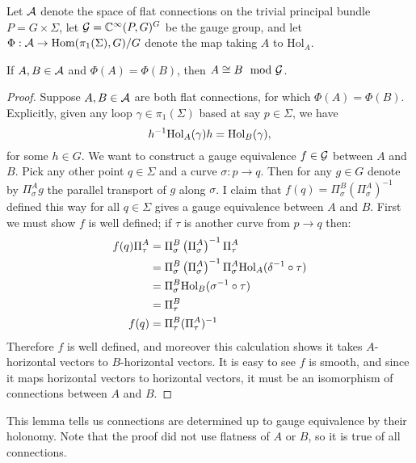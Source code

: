 	Let $\mathcal{A}$ denote the space of flat connections on the trivial principal bundle $P=G\times \Sigma$, let $\mathcal{G} = \mathbb{C}^\infty(P, G)^G$ be the gauge group, and let $\Phi:\mathcal{A} \to \text{Hom}(\pi_1(\Sigma),G)/G$ denote the map taking $A$ to $\text{Hol}_A$. 
	\begin{lemma}
		If $A,B\in \mathcal{A}$ and $\Phi(A) = \Phi(B)$, then $A \cong B \mod {\mathcal{G}}$.
	\end{lemma}
	\begin{proof}
		Suppose $A,B\in \mathcal{A}$ are both flat connections, for which $\Phi(A) = \Phi(B)$. Explicitly, given any loop $\gamma\in \pi_1(\Sigma)$ based at say $p\in \Sigma$, we have 
		\begin{equation*}
			h^{-1}\text{Hol}_A(\gamma)h = \text{Hol}_B(\gamma), 
		\end{equation*}
		for some $h\in G$. We want to construct a gauge equivalence $f\in \mathcal{G}$ between $A$ and $B$. Pick any other point $q\in \Sigma$ and a curve $\sigma:p\to q$. Then for any $g\in G$ denote by $\Pi_\sigma^Ag$ the parallel transport of $g$ along $\sigma$. I claim that $f(q) = \Pi_\sigma^B\left(\Pi_\sigma^A\right)^{-1}$ defined this way for all $q\in \Sigma$ gives a gauge equivalence between $A$ and $B$. First we must show $f$ is well defined; if $\tau$ is another curve from $p\to q$ then:
		\begin{align*}
			f(q)\Pi_\tau^A &= \Pi_\sigma^B\left(\Pi_\sigma^A\right)^{-1}\Pi_\tau^A\\
			&= \Pi_\sigma^B\left(\Pi_\sigma^A\right)^{-1}\Pi_\sigma^A\text{Hol}_A(\delta^{-1}\circ \tau)\\
			&= \Pi_\sigma^B \text{Hol}_B(\sigma^{-1}\circ \tau)\\
			&= \Pi_\tau^B\\
			f(q) &= \Pi_\tau^B (\Pi_\tau^A)^{-1}
		\end{align*}
		Therefore $f$ is well defined, and moreover this calculation shows it takes $A$-horizontal vectors to $B$-horizontal vectors. It is easy to see $f$ is smooth, and since it maps horizontal vectors to horizontal vectors, it must be an isomorphism of connections between $A$ and $B$. 
	\end{proof}
	This lemma tells us connections are determined up to gauge equivalence by their holonomy. Note that the proof did not use flatness of $A$ or $B$, so it is true of all connections. 
	
